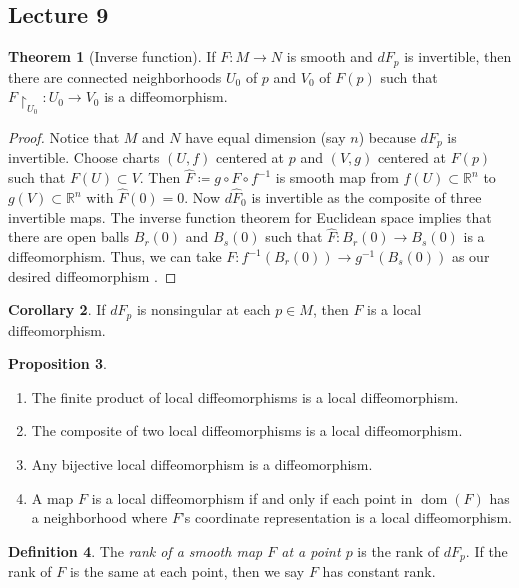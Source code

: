 \documentclass[10pt,letterpaper,cm]{nupset}
\theoremstyle{definition}
\newtheorem{definition}{Definition}[subsection]
\theoremstyle{theorem}
\newtheorem{theorem}[definition]{Theorem}
\newtheorem{prop}[definition]{Proposition}
\newtheorem{corollary}[definition]{Corollary}
\theoremstyle{remark}
\newcommand{\R}{\mathbb R}
\newcommand{\1}{\mathbf{1}}
\newcommand{\0}{\vec 0}
\DeclareMathOperator{\dom}{dom}
\begin{document}
\subsection{Lecture 9}

\begin{theorem}[Inverse function]
If $F: M \to N$ is smooth and $dF_p$ is invertible, then there are connected neighborhoods  $U_0$ of $p$ and $V_0$ of $F(p)$ such that $F\restriction_{U_0}: U_0 \to V_0$ is a diffeomorphism.
\end{theorem}
\begin{proof}
Notice that $M$ and $N$ have equal dimension (say $n$) because $dF_p$ is invertible. Choose charts $(U, f)$ centered at $p$ and $(V, g)$ centered at $F(p)$ such that $F(U) \subset V$. Then $\widehat{F}\coloneqq  g \circ F \circ f^{-1}$ is smooth map from $ f(U)\subset \R^n$ to $ g(V)\subset \R^n$ with $\widehat{F}(0) =0$. Now $d\widehat{F}_0$ is invertible as the composite of three invertible maps. The inverse function theorem for Euclidean space implies that there are open balls $B_{r}(0)$ and $B_s(0)$ such that $\widehat{F} : B_r(0) \to B_s(0)$ is a diffeomorphism. Thus, we can take $F: f^{-1}(B_r(0)) \to g^{-1}(B_s(0))$ as our desired diffeomorphism .
\end{proof}

\begin{corollary}
If $dF_p$ is nonsingular at each $p\in M$, then $F$ is a local diffeomorphism.
\end{corollary}

\begin{prop} $ $
\begin{enumerate}
\item The finite product of local diffeomorphisms is a local diffeomorphism.
\item The composite of two local diffeomorphisms is a local diffeomorphism.
\item Any bijective local diffeomorphism is a diffeomorphism.
\item A map $F$ is a local diffeomorphism if and only if each point in $\dom(F)$ has a neighborhood where $F$'s coordinate representation is a local diffeomorphism.
\end{enumerate}
\end{prop}

\begin{definition}
The \textit{rank of a smooth map $F$ at a point $p$} is the rank of $dF_p$. If the rank of $F$ is the same at each point, then we say $F$ has constant rank.
\end{definition}
\end{document}
